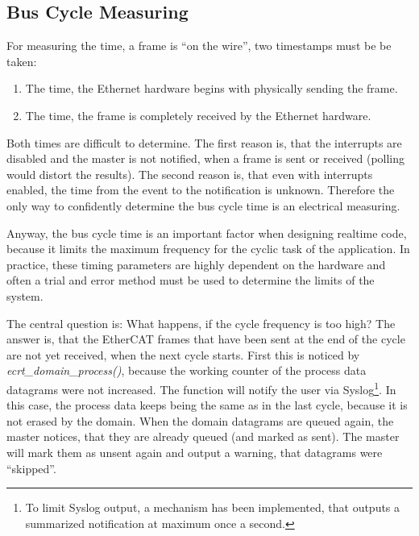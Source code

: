 \documentclass[a4paper,12pt,BCOR6mm,bibtotoc,idxtotoc]{scrbook}
\begin{document}

\subsection{Bus Cycle Measuring}
\label{sec:timing-bus}

For measuring the time, a frame is ``on the wire'', two timestamps
must be be taken:

\begin{enumerate}
\item The time, the Ethernet hardware begins with physically sending
  the frame.
\item The time, the frame is completely received by the Ethernet
  hardware.
\end{enumerate}

Both times are difficult to determine. The first reason is, that the
interrupts are disabled and the master is not notified, when a frame
is sent or received (polling would distort the results). The second
reason is, that even with interrupts enabled, the time from the event
to the notification is unknown. Therefore the only way to confidently
determine the bus cycle time is an electrical measuring.

Anyway, the bus cycle time is an important factor when designing realtime code,
because it limits the maximum frequency for the cyclic task of the application.
In practice, these timing parameters are highly dependent on the hardware and
often a trial and error method must be used to determine the limits of the
system.

The central question is: What happens, if the cycle frequency is too high? The
answer is, that the EtherCAT frames that have been sent at the end of the cycle
are not yet received, when the next cycle starts.  First this is noticed by
\textit{ecrt\_domain\_process()}, because the working counter of the process
data datagrams were not increased. The function will notify the user via
Syslog\footnote{To limit Syslog output, a mechanism has been implemented, that
outputs a summarized notification at maximum once a second.}. In this case, the
process data keeps being the same as in the last cycle, because it is not
erased by the domain. When the domain datagrams are queued again, the master
notices, that they are already queued (and marked as sent). The master will
mark them as unsent again and output a warning, that datagrams were
``skipped''.
\end{document}
